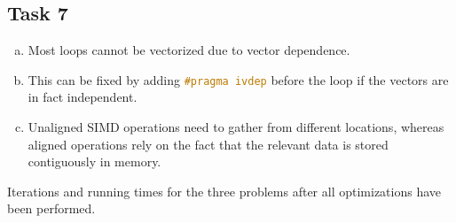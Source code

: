 \documentclass[11pt]{article}
\begin{document}
    \subsection*{Task 7}
    \label{subsec:Task7}
    \begin{enumerate}[a)]
        \item Most loops cannot be vectorized due to vector dependence.
        \item This can be fixed by adding
        \lstinline[language=c++, basicstyle=\footnotesize]{#pragma ivdep}
        before the loop if the vectors are in fact independent.
        \item Unaligned SIMD operations need to gather from different
        locations, whereas aligned operations rely on the fact that the
        relevant data is stored contiguously in memory.
    \end{enumerate}

    \begin{table}[H]
        \caption{Iterations and running times for the three problems after
        all optimizations have been performed.}
        \begin{center}
            
        \end{center}
        \label{table:FinalTimes}
    \end{table}
\end{document}
